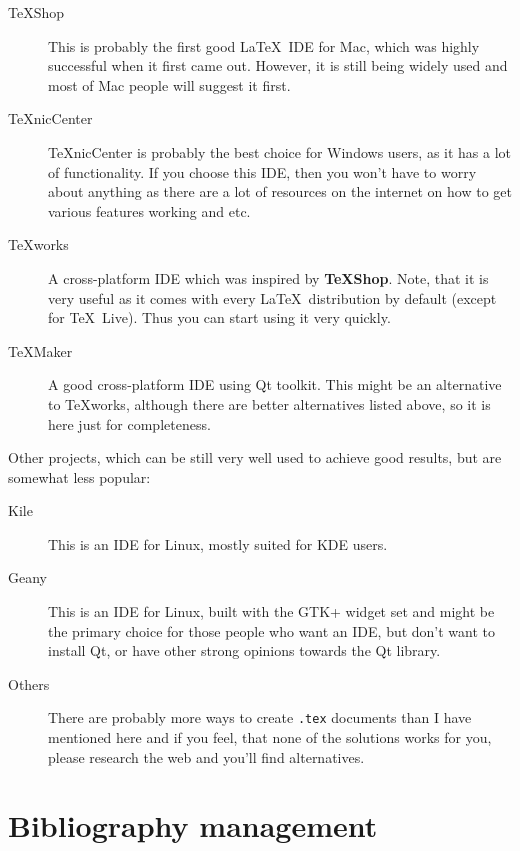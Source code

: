 \begin{description}
    \item[TeXShop] This is probably the first good \LaTeX\ IDE for Mac, which
        was highly successful when it first came out. However, it is still being
        widely used and most of Mac people will suggest it first.

    \item[TeXnicCenter] \TeX nicCenter is probably the best choice for Windows
        users, as it has a lot of functionality. If you choose this IDE, then
        you won't have to worry about anything as there are a lot of resources
        on the internet on how to get various features working and etc.

    \item[TeXworks] A cross-platform IDE which was inspired by \textbf{TeXShop}.
        Note, that it is very useful as it comes with every \LaTeX\ distribution
        by default (except for \TeX\ Live). Thus you can start using it very
        quickly.

    \item[TeXMaker] A good cross-platform IDE using Qt toolkit. This might be an
        alternative to TeXworks, although there are better alternatives listed
        above, so it is here just for completeness.
\end{description}

Other projects, which can be still very well used to achieve good results, but
are somewhat less popular:
\begin{description}
    \item[Kile] This is an IDE for Linux, mostly suited for KDE users.
    \item[Geany] This is an IDE for Linux, built with the GTK+ widget set and
        might be the primary choice for those people who want an IDE, but
        don't want to install Qt, or have other strong opinions towards the Qt
        library.
    \item[Others] There are probably more ways to create \verb|.tex| documents
        than I have mentioned here and if you feel, that none of the solutions
        works for you, please research the web and you'll find alternatives.
\end{description}

\section{Bibliography management}

